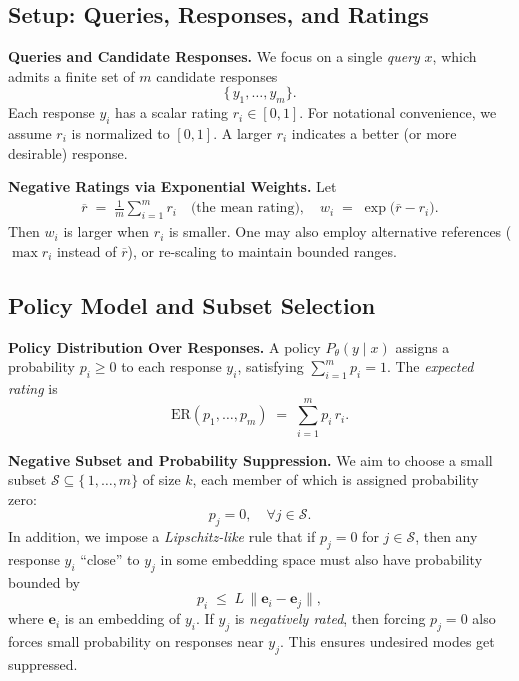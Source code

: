 \subsection{Setup: Queries, Responses, and Ratings}

\noindent
\textbf{Queries and Candidate Responses.}  
We focus on a single \emph{query} \(x\), which admits a finite set of \(m\) candidate responses 
\[
  \{\,y_1,\dots,y_m\}.
\]
Each response \(y_i\) has a scalar rating \(r_i \in [0,1]\). For notational convenience, we assume \(r_i\) is normalized to \([0,1]\). A larger \(r_i\) indicates a better (or more desirable) response.

\vspace{0.5em}
\noindent
\textbf{Negative Ratings via Exponential Weights.}  
Let 
\begin{align}
\overline{r} 
\;=\; 
\frac{1}{m}\sum_{i=1}^m r_i
\quad\text{(the mean rating)}, 
\quad
w_i 
\;=\; 
\exp\bigl(\overline{r}-r_i\bigr).
\label{eq:neg_weight}
\end{align}
Then \(w_i\) is larger when \(r_i\) is smaller. One may also employ alternative references (\(\max r_i\) instead of \(\overline{r}\)), or re-scaling to maintain bounded ranges.

\subsection{Policy Model and Subset Selection}

\noindent
\textbf{Policy Distribution Over Responses.}  
A policy \(P_\theta(y \mid x)\) assigns a probability \(p_i \ge 0\) to each response \(y_i\), satisfying 
\(\sum_{i=1}^m p_i = 1\). The \emph{expected rating} is 
\[
  \mathrm{ER}(p_1,\dots,p_m)
  \;=\;
  \sum_{i=1}^m p_i\,r_i.
\]

\vspace{0.5em}
\noindent
\textbf{Negative Subset and Probability Suppression.}  
We aim to choose a small subset \(\mathcal{S}\subseteq\{\,1,\dots,m\}\) of size \(k\), each member of which is assigned probability zero: 
\[
   p_j = 0,\quad\forall j\in \mathcal{S}.
\]
In addition, we impose a \textit{Lipschitz-like} rule that if \(p_j=0\) for \(j\in\mathcal{S}\), then any response \(y_i\) ``close'' to \(y_j\) in some embedding space must also have probability bounded by 
\[
  p_i 
  \;\le\;
  L\,\|\mathbf{e}_i - \mathbf{e}_j\|,
\]
where \(\mathbf{e}_i\) is an embedding of \(y_i\). If \(y_j\) is \emph{negatively rated}, then forcing \(p_j=0\) also forces small probability on responses near \(y_j\). This ensures undesired modes get suppressed.

